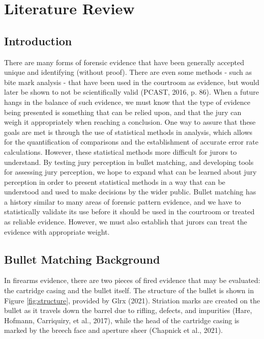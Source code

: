 \documentclass[print]{nuthesis}
\begin{document}
\hypertarget{literature-review}{%
\chapter{Literature Review}\label{literature-review}}

\hypertarget{introduction}{%
\section{Introduction}\label{introduction}}

There are many forms of forensic evidence that have been generally accepted  unique and identifying (without proof).
There are even some methods - such as bite mark analysis - that have been used in the courtroom as evidence, but would later be shown to not be scientifically valid (PCAST, 2016, p. 86).
When a  future hangs in the balance of such evidence, we must know that the type of evidence being presented is something that can be relied upon, and that the jury can weigh it appropriately when reaching a conclusion.
One way to assure that these goals are met is through the use of statistical methods in analysis, which allows for the quantification of comparisons and the establishment of accurate error rate calculations.
However,  these statistical methods  more difficult for jurors to understand.
By testing jury perception in bullet matching, and developing tools for assessing jury perception, we hope to expand what can be learned about jury perception in order to present statistical methods in a way that can be understood and used to make decisions by the wider public.
Bullet matching has a history similar to many areas of forensic pattern evidence, and we have to statistically validate its use before it should be used in the courtroom or treated as reliable evidence.
However, we must also establish that jurors can treat the evidence with appropriate weight.

\hypertarget{bullet-matching-background}{%
\section{Bullet Matching Background}\label{bullet-matching-background}}

In firearms evidence, there are two pieces of fired evidence that may be evaluated: the cartridge casing and the bullet itself.
The structure of the bullet is shown in Figure \ref{fig:structure}, provided by Glrx (2021).
Striation marks are created on the bullet as it travels down the barrel due to rifling, defects, and impurities (Hare, Hofmann, Carriquiry, et al., 2017), while the head of the cartridge casing is marked by the breech face and aperture sheer (Chapnick et al., 2021).
\end{document}
